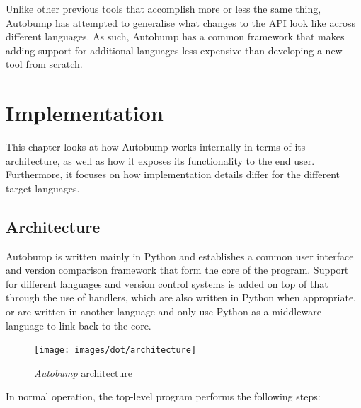 \documentclass{l4proj}
\begin{document}
Unlike other previous tools that accomplish more or less the same
thing, Autobump has attempted to generalise what changes to the API look
like across different languages. As such, Autobump has a common
framework that makes adding support for additional languages less
expensive than developing a new tool from scratch.

\chapter{Implementation}
\label{Implementation}

This chapter looks at how Autobump works internally in terms of its
architecture, as well as how it exposes its functionality to the end
user. Furthermore, it focuses on how implementation details differ for
the different target languages.

\section{Architecture}
\label{Architecture}

Autobump is written mainly in Python and establishes a common user
interface and version comparison framework that form the core of the
program. Support for different languages and version control systems
is added on top of that through the use of handlers, which are also
written in Python when appropriate, or are written in another language
and only use Python as a middleware language to link back to the core.

\begin{figure}[t]
\label{ArchitectureFig}
\centering
\texttt{[image: images/dot/architecture]}
\caption{\textit{Autobump} architecture}
\end{figure}

In normal operation, the top-level program performs the
following steps:
\end{document}
